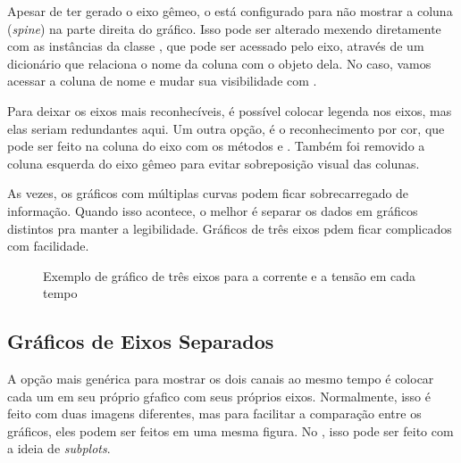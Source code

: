     Apesar de ter gerado o eixo gêmeo, o \matplotlib está configurado para não mostrar a coluna (\textit{spine}) na parte direita do gráfico. Isso pode ser alterado mexendo diretamente com as instâncias da classe , que pode ser acessado pelo eixo, através de um dicionário que relaciona o nome da coluna com o objeto dela. No caso, vamos acessar a coluna de nome  e mudar sua visibilidade com .

    Para deixar os eixos mais reconhecíveis, é possível colocar legenda nos eixos, mas elas seriam redundantes aqui. Um outra opção, é o reconhecimento por cor, que pode ser feito na coluna do eixo com os métodos  e . Também foi removido a coluna esquerda do eixo gêmeo para evitar sobreposição visual das colunas.

    \begin{nota}
        As vezes, os gráficos com múltiplas curvas podem ficar sobrecarregado de informação. Quando isso acontece, o melhor é separar os dados em gráficos distintos pra manter a legibilidade. Gráficos de três eixos pdem ficar complicados com facilidade.
    \end{nota}

    \begin{figure}[H]
        \centering
        

        \caption{Exemplo de gráfico de três eixos para a corrente e a tensão em cada tempo}
        \label{fig:multiv:duplo}
    \end{figure}


\subsection{Gráficos de Eixos Separados}

    A opção mais genérica para mostrar os dois canais ao mesmo tempo é colocar cada um em seu próprio gŕafico com seus próprios eixos. Normalmente, isso é feito com duas imagens diferentes, mas para facilitar a comparação entre os gráficos, eles podem ser feitos em uma mesma figura. No \matplotlib, isso pode ser feito com a ideia de \textit{subplots}.

